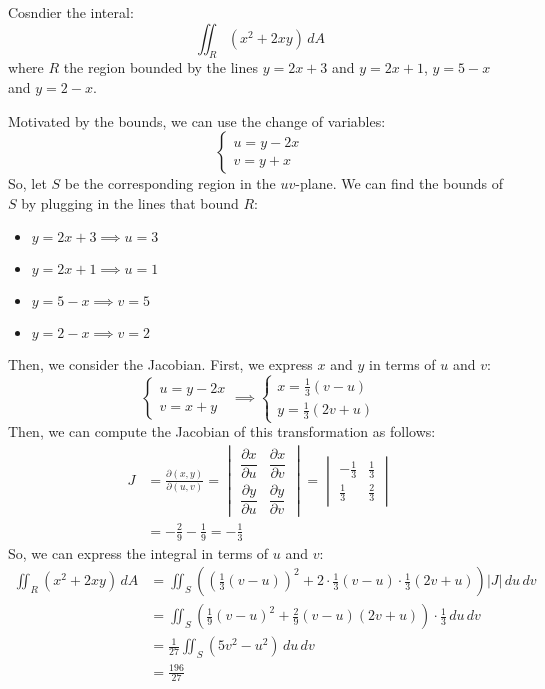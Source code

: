 \documentclass[11pt]{report}
\begin{document}
\begin{example}
    Cosndier the interal:
    $$
        \iint_R (x^2 + 2xy) \, dA
    $$
    where $R$ the region bounded by the lines $y=2x + 3$ and $y=2x + 1$, $y=5-x$ and $y=2 - x$.

    Motivated by the bounds, we can use the change of variables:
    $$
    \begin{cases}
        u = y - 2x \\
        v = y + x
    \end{cases}
    $$ 
    So, let $S$ be the corresponding region in the $uv$-plane. We can find the bounds of $S$ by plugging in the lines that bound $R$:
    \begin{itemize}
        \item $y = 2x + 3 \implies u = 3$
        \item $y = 2x + 1 \implies u = 1$
        \item $y = 5 - x \implies v = 5$
        \item $y = 2 - x \implies v = 2$
    \end{itemize}
    
    Then, we consider the Jacobian. First, we express $x$ and $y$ in terms of $u$ and $v$:
    $$
    \begin{cases}
        u = y - 2x \\
        v = x + y
    \end{cases} \implies \begin{cases}
        x = \frac{1}{3} (v - u) \\
        y = \frac{1}{3} (2v + u)
    \end{cases}
    $$
    Then, we can compute the Jacobian of this transformation as follows:
    \begin{align*}
        J &= \frac{\partial(x,y)}{\partial(u,v)} = \begin{vmatrix}
            \dfrac{\partial x}{\partial u} & \dfrac{\partial x}{\partial v} \\
            \dfrac{\partial y}{\partial u} & \dfrac{\partial y}{\partial v}
        \end{vmatrix} = \begin{vmatrix}
            -\frac{1}{3} & \frac{1}{3} \\
            \frac{1}{3} & \frac{2}{3}
        \end{vmatrix} \\
        &= -\frac{2}{9} - \frac{1}{9} = -\frac{1}{3}
    \end{align*}
    So, we can express the integral in terms of $u$ and $v$:
    \begin{align*}
        \iint_R (x^2 + 2xy) \, dA &= \iint_S \left( \left(\frac{1}{3} (v - u)\right)^2 + 2 \cdot \frac{1}{3} (v - u) \cdot \frac{1}{3} (2v + u) \right) |J| \, du \, dv \\
        &= \iint_S \left( \frac{1}{9} (v - u)^2 + \frac{2}{9} (v - u)(2v + u) \right) \cdot \frac{1}{3} \, du \, dv \\
        &= \frac{1}{27} \iint_S (5v^2 - u^2) \, du \, dv \\
        &= \frac{196}{27}
    \end{align*}
\end{example}
\end{document}
